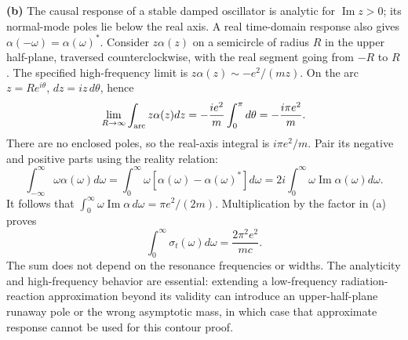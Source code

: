 \textbf{(b)} The causal response of a stable damped oscillator is
analytic for $\operatorname{Im}z>0$; its normal-mode poles lie below
the real axis. A real time-domain response also gives
$\alpha(-\omega)=\alpha(\omega)^*$.
Consider $z\alpha(z)$ on a semicircle of radius $R$ in the upper
half-plane, traversed counterclockwise, with the real segment going
from $-R$ to $R$. The specified high-frequency limit is
$z\alpha(z)\sim-e^2/(mz)$.
On the arc $z=Re^{i\theta}$, $dz=iz\,d\theta$, hence
\[
\lim_{R\to\infty}\int_{\rm arc}z\alpha(z)dz
=-\frac{ie^2}{m}\int_0^\pi d\theta=-\frac{i\pi e^2}{m}.
\]
There are no enclosed poles, so the real-axis integral is
$i\pi e^2/m$. Pair its negative and positive parts using the reality
relation:
\[
\int_{-\infty}^{\infty}\omega\alpha(\omega)d\omega
=\int_0^\infty\omega[\alpha(\omega)-\alpha(\omega)^*]d\omega
=2i\int_0^\infty\omega\operatorname{Im}\alpha(\omega)d\omega.
\]
It follows that $\int_0^\infty\omega\operatorname{Im}\alpha\,d\omega
=\pi e^2/(2m)$. Multiplication by the factor in (a) proves
\[
\boxed{\int_0^\infty\sigma_t(\omega)d\omega
=\frac{2\pi^2e^2}{mc}.}
\]
The sum does not depend on the resonance frequencies or widths.
The analyticity and high-frequency behavior are essential: extending
a low-frequency radiation-reaction approximation beyond its validity
can introduce an upper-half-plane runaway pole or the wrong asymptotic
mass, in which case that approximate response cannot be used for this
contour proof.
